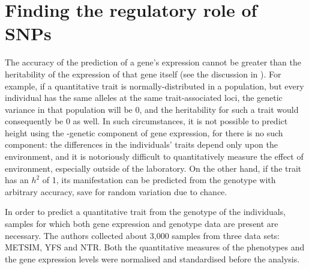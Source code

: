\documentclass[../main.tex]{subfiles}
\begin{document}
\section{Finding the \cis regulatory role of SNPs}

The accuracy of the prediction of a gene's expression cannot be greater 
than the heritability of the expression of that gene itself (see the 
discussion in ). For example, if a quantitative 
trait is normally-distributed in a population, but every individual has 
the same alleles at the same trait-associated loci, the genetic variance 
in that population will be 0, and the heritability for such a trait 
would consequently be 0 as well. In such circumstances, it is not 
possible to predict height using the \cis-genetic component of gene 
expression, for there is no such component: the differences in the 
individuals' traits depend only upon the environment, and it is 
notoriously difficult to quantitatively measure the effect of 
environment, especially outside of the laboratory. On the other hand, if 
the trait has an $h^2$ of 1, its manifestation can be predicted from the 
genotype with arbitrary accuracy, save for random variation due to 
chance.

In order to predict a quantitative trait from the genotype of the 
individuals, samples for which both gene expression and genotype data 
are present are necessary. The authors collected about 3,000 samples 
from three data sets: METSIM, YFS and NTR. Both the quantitative 
measures of the phenotypes and the gene expression levels were 
normalised and standardised before the analysis.

\end{document}
